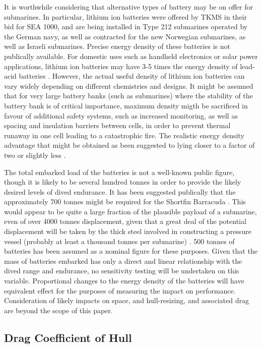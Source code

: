 \documentclass{article}\usepackage[]{graphicx}\usepackage[]{color}
\begin{document}
It is worthwhile considering that alternative types of battery may be on offer for submarines.  In particular, lithium ion batteries were offered by TKMS in their bid for SEA 1000, and are being installed in Type 212 submarines operated by the German navy, as well as contracted for the new Norwegian submarines, as well as Israeli submarines. Precise energy density of these batteries is not publically available.  For domestic uses such as handheld electronics or solar power applications, lithium ion batteries may have 3-5 times the energy density of lead-acid batteries \parencite{oconnor2017}.  However, the actual useful density of lithium ion batteries can vary widely depending on different chemistries and designs.  It might be assumed that for very large battery banks (such as submarines) where the stability of the battery bank is of critical importance, maximum density migth be sacrificed in favour of additional safety systems, such as increased monitoring, as well as spacing and insulation barriers between cells, in order to prevent thermal runaway in one cell leading to a catastrophic fire.  The realistic energy density advantage that might be obtained as been suggested to lying closer to a factor of two or slightly less \parencite{greenfield2016}.

The total embarked load of the batteries is not a well-known public figure, though it is likely to be several hundred tonnes in order to provide the likely desired levels of dived endurance.  It has been suggested publically that the approximately 700 tonnes might be required for the Shortfin Barracuda \parencite{ohff2017}.  This would appear to be quite a large fraction of the plausible payload of a submarine, even of over 4000 tonnes displacement, given that a great deal of the potential displacement will be taken by the thick steel involved in constructing a pressure vessel (probably at least a thousand tonnes per submarine) \parencite{jean2017}.  500 tonnes of batteries has been assumed as a nominal figure for these purposes.  Given that the mass of batteries embarked has only a direct and linear relationship with the dived range and endurance, no sensitivity testing will be undertaken on this variable.  Proportional changes to the energy density of the batteries will have equivalent effect for the purposes of measuring the impact on performance. Consideration of likely impacts on space, and hull-resizing, and associated drag are beyond the scope of this paper.

\subsection{Drag Coefficient of Hull}
\end{document}
